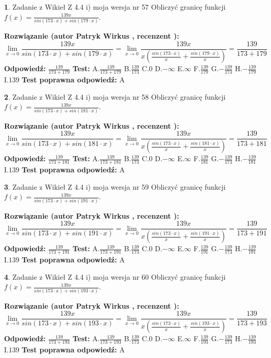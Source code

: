 \documentclass[12pt, a4paper]{article}
\theoremstyle{definition} %
\newtheorem{zad}{}
\newcommand{\zadStart}[1]{\begin{zad}#1\newline}
\newcommand{\zadStop}{\end{zad}}
\newcommand{\rozwStart}[2]{\noindent \textbf{Rozwiązanie (autor #1 , recenzent #2): }\newline}
\newcommand{\rozwStop}{\newline}
\newcommand{\odpStart}{\noindent \textbf{Odpowiedź:}\newline}
\newcommand{\odpStop}{\newline}
\newcommand{\testStart}{\noindent \textbf{Test:}\newline}
\newcommand{\testStop}{\newline}
\newcommand{\kluczStart}{\noindent \textbf{Test poprawna odpowiedź:}\newline}
\newcommand{\kluczStop}{\newline}
\begin{document}
\zadStart{Zadanie z Wikieł Z 4.4 i) moja wersja nr 57}
Obliczyć granicę funkcji $f(x)=\frac{139x}{sin(173\cdot x) +sin(179\cdot x)}$.
\zadStop
\rozwStart{Patryk Wirkus}{}
$$\lim\limits_{x\to 0}\frac{139x}{sin(173\cdot x) +sin(179\cdot x)}=\lim\limits_{x\to 0}\frac{139x}{x(\frac{sin(173\cdot x)}{x}+\frac{sin(179\cdot x)}{x})}=\frac{139}{173+179}$$
\rozwStop
\odpStart
$\frac{139}{173+179}$
\odpStop
\testStart
A.$\frac{139}{173+179}$
B.$\frac{139}{173}$
C.$0$
D.$-\infty$
E.$\infty$
F.$\frac{139}{179}$
G.$-\frac{139}{173}$
H.$-\frac{139}{179}$
I.$139$
\testStop
\kluczStart
A
\kluczStop



\zadStart{Zadanie z Wikieł Z 4.4 i) moja wersja nr 58}
Obliczyć granicę funkcji $f(x)=\frac{139x}{sin(173\cdot x) +sin(181\cdot x)}$.
\zadStop
\rozwStart{Patryk Wirkus}{}
$$\lim\limits_{x\to 0}\frac{139x}{sin(173\cdot x) +sin(181\cdot x)}=\lim\limits_{x\to 0}\frac{139x}{x(\frac{sin(173\cdot x)}{x}+\frac{sin(181\cdot x)}{x})}=\frac{139}{173+181}$$
\rozwStop
\odpStart
$\frac{139}{173+181}$
\odpStop
\testStart
A.$\frac{139}{173+181}$
B.$\frac{139}{173}$
C.$0$
D.$-\infty$
E.$\infty$
F.$\frac{139}{181}$
G.$-\frac{139}{173}$
H.$-\frac{139}{181}$
I.$139$
\testStop
\kluczStart
A
\kluczStop



\zadStart{Zadanie z Wikieł Z 4.4 i) moja wersja nr 59}
Obliczyć granicę funkcji $f(x)=\frac{139x}{sin(173\cdot x) +sin(191\cdot x)}$.
\zadStop
\rozwStart{Patryk Wirkus}{}
$$\lim\limits_{x\to 0}\frac{139x}{sin(173\cdot x) +sin(191\cdot x)}=\lim\limits_{x\to 0}\frac{139x}{x(\frac{sin(173\cdot x)}{x}+\frac{sin(191\cdot x)}{x})}=\frac{139}{173+191}$$
\rozwStop
\odpStart
$\frac{139}{173+191}$
\odpStop
\testStart
A.$\frac{139}{173+191}$
B.$\frac{139}{173}$
C.$0$
D.$-\infty$
E.$\infty$
F.$\frac{139}{191}$
G.$-\frac{139}{173}$
H.$-\frac{139}{191}$
I.$139$
\testStop
\kluczStart
A
\kluczStop



\zadStart{Zadanie z Wikieł Z 4.4 i) moja wersja nr 60}
Obliczyć granicę funkcji $f(x)=\frac{139x}{sin(173\cdot x) +sin(193\cdot x)}$.
\zadStop
\rozwStart{Patryk Wirkus}{}
$$\lim\limits_{x\to 0}\frac{139x}{sin(173\cdot x) +sin(193\cdot x)}=\lim\limits_{x\to 0}\frac{139x}{x(\frac{sin(173\cdot x)}{x}+\frac{sin(193\cdot x)}{x})}=\frac{139}{173+193}$$
\rozwStop
\odpStart
$\frac{139}{173+193}$
\odpStop
\testStart
A.$\frac{139}{173+193}$
B.$\frac{139}{173}$
C.$0$
D.$-\infty$
E.$\infty$
F.$\frac{139}{193}$
G.$-\frac{139}{173}$
H.$-\frac{139}{193}$
I.$139$
\testStop
\kluczStart
A
\kluczStop
\end{document}
